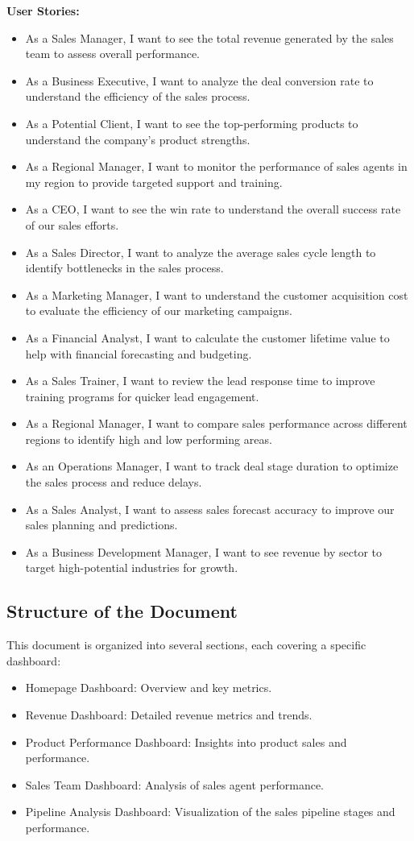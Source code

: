 \documentclass{article}
\begin{document}
\noindent \textbf{User Stories:}
\begin{itemize}
    \item As a Sales Manager, I want to see the total revenue generated by the sales team to assess overall performance.
    \item As a Business Executive, I want to analyze the deal conversion rate to understand the efficiency of the sales process.
    \item As a Potential Client, I want to see the top-performing products to understand the company’s product strengths.
    \item As a Regional Manager, I want to monitor the performance of sales agents in my region to provide targeted support and training.
    \item As a CEO, I want to see the win rate to understand the overall success rate of our sales efforts.
    \item As a Sales Director, I want to analyze the average sales cycle length to identify bottlenecks in the sales process.
    \item As a Marketing Manager, I want to understand the customer acquisition cost to evaluate the efficiency of our marketing campaigns.
    \item As a Financial Analyst, I want to calculate the customer lifetime value to help with financial forecasting and budgeting.
    \item As a Sales Trainer, I want to review the lead response time to improve training programs for quicker lead engagement.
    \item As a Regional Manager, I want to compare sales performance across different regions to identify high and low performing areas.
    \item As an Operations Manager, I want to track deal stage duration to optimize the sales process and reduce delays.
    \item As a Sales Analyst, I want to assess sales forecast accuracy to improve our sales planning and predictions.
    \item As a Business Development Manager, I want to see revenue by sector to target high-potential industries for growth.
\end{itemize}


\subsection{Structure of the Document}
This document is organized into several sections, each covering a specific dashboard:
\begin{itemize}
    \item Homepage Dashboard: Overview and key metrics.
    \item Revenue Dashboard: Detailed revenue metrics and trends.
    \item Product Performance Dashboard: Insights into product sales and performance.
    \item Sales Team Dashboard: Analysis of sales agent performance.
    \item Pipeline Analysis Dashboard: Visualization of the sales pipeline stages and performance.
\end{itemize}
\newpage
\end{document}
